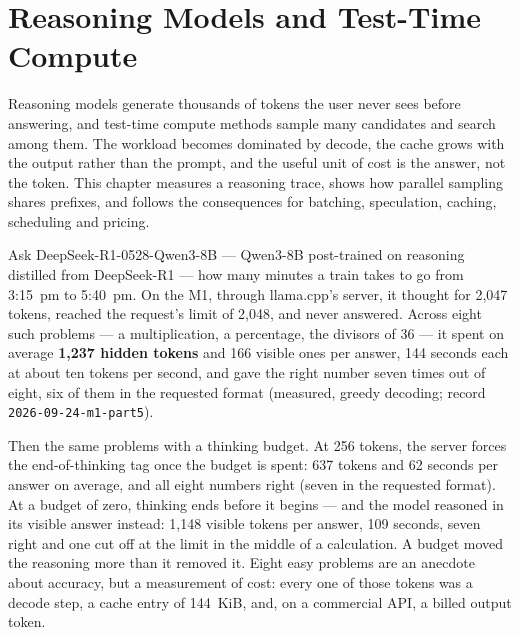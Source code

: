 \chapter{Reasoning Models and Test-Time Compute}\label{ch:reasoning-workloads}

\begin{ChapterIntent}
Reasoning models generate thousands of tokens the user never sees before
answering, and test-time compute methods sample many candidates and search
among them. The workload becomes dominated by decode, the cache grows with the
output rather than the prompt, and the useful unit of cost is the answer, not
the token. This chapter measures a reasoning trace, shows how parallel
sampling shares prefixes, and follows the consequences for batching,
speculation, caching, scheduling and pricing.
\end{ChapterIntent}


Ask DeepSeek-R1-0528-Qwen3-8B --- Qwen3-8B post-trained on reasoning
distilled from DeepSeek-R1 \cite{deepseek2025r1qwen3,deepseek2025r1} --- how
many minutes a train takes to go from 3:15~pm to 5:40~pm. On the M1, through
llama.cpp's server, it thought for 2,047 tokens, reached the request's limit of
2,048, and never answered. Across eight such problems --- a multiplication, a
percentage, the divisors of 36 --- it spent on average \textbf{1,237 hidden
tokens} and 166 visible ones per answer, 144 seconds each at about ten tokens
per second, and gave the right number seven times out of eight, six of them in
the requested format (measured, greedy decoding; record
\texttt{2026-09-24-m1-part5}).

Then the same problems with a thinking budget. At 256 tokens, the server forces
the end-of-thinking tag once the budget is spent: 637 tokens and 62 seconds per
answer on average, and all eight numbers right (seven in the requested format).
At a budget of zero, thinking ends before it begins --- and the model reasoned
in its visible answer instead: 1,148 visible tokens per answer, 109 seconds,
seven right and one cut off at the limit in the middle of a calculation. A
budget moved the reasoning more than it removed it. Eight easy problems are an
anecdote about accuracy, but a measurement of cost: every one of those tokens
was a decode step, a cache entry of 144~KiB, and, on a commercial API, a billed
output token.

